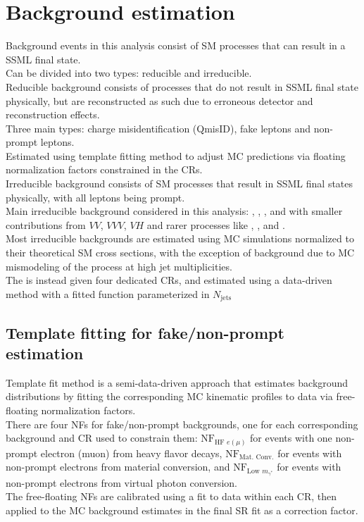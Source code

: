 \documentclass[../thesis.tex]{subfiles}
\begin{document}
\section{Background estimation}
\label{sec:bg}
Background events in this analysis consist of SM processes that can result in a \tttt SSML final state.\\
Can be divided into two types: reducible and irreducible.\\
Reducible background consists of processes that do not result in SSML final state physically, but are reconstructed as such due to erroneous detector and reconstruction effects.\\
Three main types: charge misidentification (QmisID), fake leptons and non-prompt leptons.\\
Estimated using template fitting method to adjust MC predictions via floating normalization factors constrained in the CRs.\\
Irreducible background consists of SM processes that result in SSML final states physically, with all leptons being prompt.\\
Main irreducible background considered in this analysis: \tttt, \ttW, \ttZ, and \ttH with smaller contributions from $VV$, $VVV$, $VH$ and rarer processes like \ttVV, \tWZ, \tZq and \ttt.\\
Most irreducible backgrounds are estimated using MC simulations normalized to their theoretical SM cross sections, with the exception of \ttW background due to MC mismodeling of the process at high jet multiplicities.\\
The \ttW is instead given four dedicated CRs, and estimated using a data-driven method with a fitted function parameterized in $N_\mathrm{jets}$
\subsection{Template fitting for fake/non-prompt estimation}
\label{sec:template}
Template fit method is a semi-data-driven approach that estimates background distributions by fitting the corresponding MC kinematic profiles to data via free-floating normalization factors.\\
There are four NFs for fake/non-prompt backgrounds, one for each corresponding background and CR used to constrain them: $\mathrm{NF}_{\text{HF }e(\mu)}$ for events with one non-prompt electron (muon) from heavy flavor decays, $\mathrm{NF}_{\text{Mat. Conv.}}$ for events with non-prompt electrons from material conversion, and $\mathrm{NF}_{\text{Low }m_{\gamma^{*}}}$ for events with non-prompt electrons from virtual photon conversion.\\
The free-floating NFs are calibrated using a fit to data within each CR, then applied to the MC background estimates in the final SR fit as a correction factor.
\end{document}
